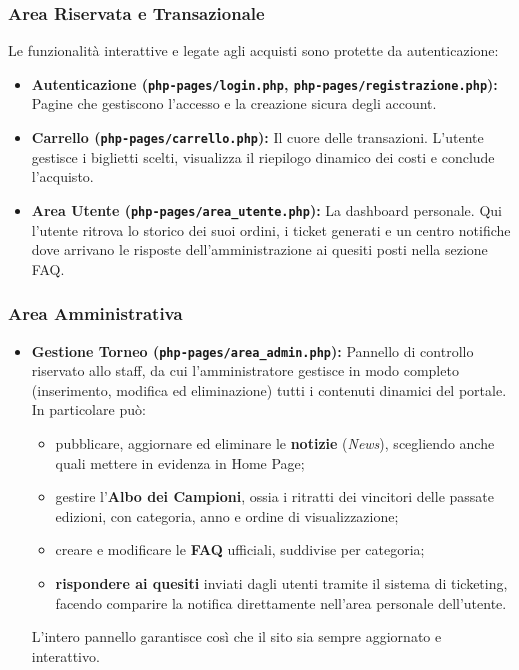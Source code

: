 \documentclass[11pt,a4paper]{article}
\begin{document}
\subsubsection{Area Riservata e Transazionale}
Le funzionalità interattive e legate agli acquisti sono protette da autenticazione:
\begin{itemize}
    \item \textbf{Autenticazione (\texttt{php-pages/login.php}, \texttt{php-pages/registrazione.php}):} Pagine che gestiscono l'accesso e la creazione sicura degli account.
    \item \textbf{Carrello (\texttt{php-pages/carrello.php}):} Il cuore delle transazioni. L'utente gestisce i biglietti scelti, visualizza il riepilogo dinamico dei costi e conclude l'acquisto.
    \item \textbf{Area Utente (\texttt{php-pages/area\_utente.php}):} La dashboard personale. Qui l'utente ritrova lo storico dei suoi ordini, i ticket generati e un centro notifiche dove arrivano le risposte dell'amministrazione ai quesiti posti nella sezione FAQ.
\end{itemize}

\subsubsection{Area Amministrativa}
\begin{itemize}
    \item \textbf{Gestione Torneo (\texttt{php-pages/area\_admin.php}):} Pannello di controllo riservato allo staff, da cui l'amministratore gestisce in modo completo (inserimento, modifica ed eliminazione) tutti i contenuti dinamici del portale. In particolare può:
    \begin{itemize}
        \item pubblicare, aggiornare ed eliminare le \textbf{notizie} (\textit{News}), scegliendo anche quali mettere in evidenza in Home Page;
        \item gestire l'\textbf{Albo dei Campioni}, ossia i ritratti dei vincitori delle passate edizioni, con categoria, anno e ordine di visualizzazione;
        \item creare e modificare le \textbf{FAQ} ufficiali, suddivise per categoria;
        \item \textbf{rispondere ai quesiti} inviati dagli utenti tramite il sistema di ticketing, facendo comparire la notifica direttamente nell'area personale dell'utente.
    \end{itemize}
    L'intero pannello garantisce così che il sito sia sempre aggiornato e interattivo.
\end{itemize}
\end{document}

